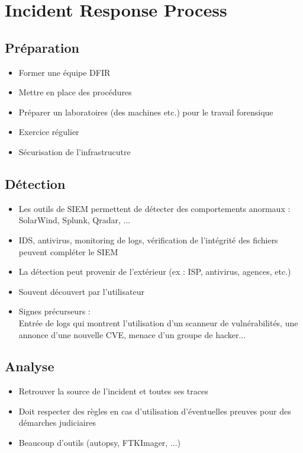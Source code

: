 \documentclass[a4paper]{article}
\begin{document}
\section{Incident Response Process}

\subsection{Préparation}
\begin{itemize}[label=\textbullet, font=\Large]
    \item Former une équipe DFIR
    \item Mettre en place des procédures
    \item Préparer un laboratoires (des machines etc.) pour le travail forensique
    \item Exercice régulier
    \item Sécurisation de l'infrastrucutre
\end{itemize}

\subsection{Détection}
\begin{itemize}[label=\textbullet, font=\Large]
    \item Les outils de SIEM permettent de détecter des comportements anormaux :\\
    SolarWind, Splunk, Qradar, ...
    \item IDS, antivirus, monitoring de logs, vérification de l'intégrité des fichiers peuvent compléter le SIEM
    \item La détection peut provenir de l'extérieur (ex : ISP, antivirus, agences, etc.)
    \item Souvent découvert par l'utilisateur
    \item Signes précurseurs :\\
    Entrée de logs qui montrent l'utilisation d'un scanneur de vulnérabilités, une annonce d'une nouvelle CVE, menace d'un groupe de hacker...
\end{itemize}

\subsection{Analyse}
\begin{itemize}[label=\textbullet, font=\Large]
    \item Retrouver la source de l'incident et toutes ses traces
    \item Doit respecter des règles en cas d'utilisation d'éventuelles preuves pour des démarches judiciaires
    \item Beaucoup d'outils (autopsy, FTKImager, ...)
\end{itemize}
\end{document}
